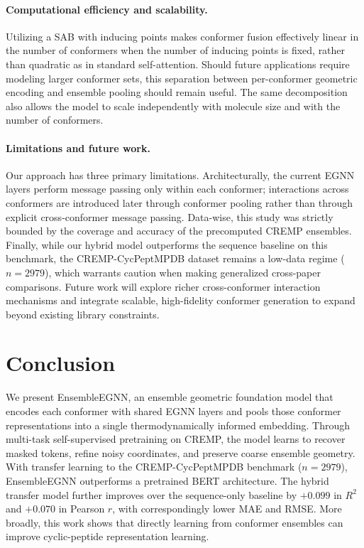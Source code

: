 \documentclass{article}
\begin{document}
\paragraph{Computational efficiency and scalability.}
Utilizing a SAB with inducing points makes conformer fusion effectively linear in the number of conformers when the number of inducing points is fixed, rather than quadratic as in standard self-attention. Should future applications require modeling larger conformer sets, this separation between per-conformer geometric encoding and ensemble pooling should remain useful. The same decomposition also allows the model to scale independently with molecule size and with the number of conformers.

\paragraph{Limitations and future work.}
Our approach has three primary limitations. Architecturally, the current EGNN layers perform message passing only within each conformer; interactions across conformers are introduced later through conformer pooling rather than through explicit cross-conformer message passing. Data-wise, this study was strictly bounded by the coverage and accuracy of the precomputed CREMP ensembles. Finally, while our hybrid model outperforms the sequence baseline on this benchmark, the CREMP-CycPeptMPDB dataset remains a low-data regime ($n=2979$), which warrants caution when making generalized cross-paper comparisons. Future work will explore richer cross-conformer interaction mechanisms and integrate scalable, high-fidelity conformer generation to expand beyond existing library constraints.

\section{Conclusion}
\label{sec:conclusion}
We present EnsembleEGNN, an ensemble geometric foundation model that encodes each conformer with shared EGNN layers and pools those conformer representations into a single thermodynamically informed embedding. Through multi-task self-supervised pretraining on CREMP, the model learns to recover masked tokens, refine noisy coordinates, and preserve coarse ensemble geometry. With transfer learning to the CREMP-CycPeptMPDB benchmark ($n=2979$), EnsembleEGNN outperforms a pretrained BERT architecture. The hybrid transfer model further improves over the sequence-only baseline by $+0.099$ in $R^2$ and $+0.070$ in Pearson $r$, with correspondingly lower MAE and RMSE. More broadly, this work shows that directly learning from conformer ensembles can improve cyclic-peptide representation learning.
\end{document}

